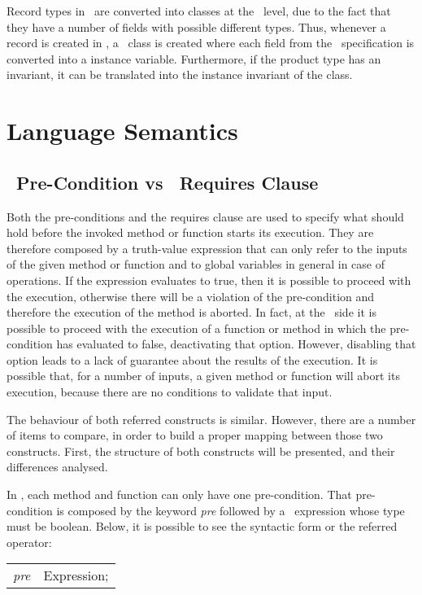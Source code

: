 Record types in \vpp\ are converted into classes at the \vpp\ level, due to the fact that they have a number of fields with possible different types. Thus, whenever a record is created in \vpp, a \jml\ class is created where each field from the \vpp\ specification is converted into a instance variable. Furthermore, if the product type has an invariant, it can be translated into the instance invariant of the class.

\section{Language Semantics}
\label{chap3:langsem}

\subsection{\vpp\ Pre-Condition vs \jml\ Requires Clause}
\label{subsec:pre}

Both the pre-conditions and the requires clause are used to specify what should hold before the invoked method or function starts its execution. They are therefore composed by a truth-value expression that can only refer to the inputs of the given method or function and to global variables in general in case of operations. If the expression evaluates to true, then it is possible to proceed with the execution, otherwise there will be a violation of the pre-condition and therefore the execution of the method is aborted. In fact, at the \vpp\ side it is possible to proceed with the execution of a function or method in which the pre-condition has evaluated to false, deactivating that option. However, disabling that option leads to a lack of guarantee about the results of the execution. It is possible that, for a number of inputs, a given method or function will abort its execution, because there are no conditions to validate that input.

The behaviour of both referred constructs is similar. However, there are a number of items to compare, in order to build a proper mapping between those two constructs. First, the structure of both constructs will be presented, and their differences analysed.

In \vpp, each method and function can only have one pre-condition. That pre-condition is composed by the keyword \textit{pre} followed by a \vpp\ expression whose type must be  boolean. Below, it is possible to see the syntactic form or the referred operator:

\begin{center}
\begin{tabular}{ll}
\textit{pre} & Expression;\\
\end{tabular}
\end{center}


